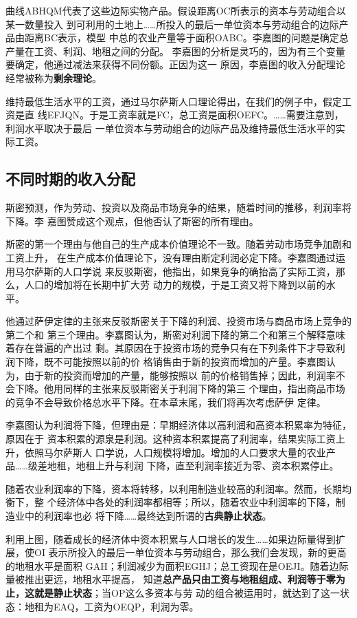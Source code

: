 曲线ABHQM代表了这些边际实物产品。假设距离OC所表示的资本与劳动组合以某一数量投入
到可利用的土地上……所投入的最后一单位资本与劳动组合的边际产品由距离BC表示，模型
中总的农业产量等于面积OABC。李嘉图的问题是确定总产量在工资、利润、地租之间的分配。
李嘉图的分析是灵巧的，因为有三个变量要确定，他通过减法来获得不同份额。正因为这一
原因，李嘉图的收入分配理论经常被称为\textbf{剩余理论}。

维持最低生活水平的工资，通过马尔萨斯人口理论得出，在我们的例子中，假定工资是直
线EFJQN。于是工资率就是FC，总工资是面积OEFC。……需要注意到，利润水平取决于最后
一单位资本与劳动组合的边际产品及维持最低生活水平的实际工资。

\subsection{不同时期的收入分配}

斯密预测，作为劳动、投资以及商品市场竞争的结果，随着时间的推移，利润率将下降。李
嘉图赞成这个观点，但他否认了斯密的所有理由。

斯密的第一个理由与他自己的生产成本价值理论不一致。随着劳动市场竞争加剧和工资上升，
在生产成本价值理论下，没有理由断定利润必定下降。李嘉图通过运用马尔萨斯的人口学说
来反驳斯密，他指出，如果竞争的确抬高了实际工资，那么，人口的增加将在长期中扩大劳
动力的规模，于是工资又将下降到以前的水平。

他通过萨伊定律的主张来反驳斯密关于下降的利润、投资市场与商品市场上竞争的第二个和
第三个理由。李嘉图认为，斯密对利润下降的第二个和第三个解释意味着存在普遍的产出过
剩。其原因在于投资市场的竞争只有在下列条件下才导致利润下降，既不可能按照以前的价
格销售由于新的投资而增加的产量。李嘉图认为，由于新的投资而增加的产量，能够按照以
前的价格销售掉；因此，利润率不会下降。他用同样的主张来反驳斯密关于利润下降的第三
个理由，指出商品市场的竞争不会导致价格总水平下降。在本章末尾，我们将再次考虑萨伊
定律。

李嘉图认为利润将下降，但理由是：早期经济体以高利润和高资本积累率为特征，原因在于
资本积累的源泉是利润。这种资本积累提高了利润率，结果实际工资上升，依照马尔萨斯人
口学说，人口规模将增加。增加的人口要求大量的农业产品……级差地租，地租上升与利润
下降，直至利润率接近为零、资本积累停止。

随着农业利润率的下降，资本将转移，以利用制造业较高的利润率。然而，长期均衡下，整
个经济体中各处的利润率都相等；所以，随着农业中利润率的下降，制造业中的利润率也必
将下降……最终达到所谓的\textbf{古典静止状态}。

利用上图，随着成长的经济体中资本积累与人口增长的发生……如果边际量得到扩展，使OI
表示所投入的最后一单位资本与劳动组合，那么我们会发现，新的更高的地租水平是面积
GAH；利润减少为面积EGHJ；总工资现在是OEJI。随着边际量被推出更远，地租水平提高，
知道\textbf{总产品只由工资与地租组成、利润等于零为止，这就是静止状态}；当OP这么多资本与劳
动的组合被运用时，就达到了这一状态：地租为EAQ，工资为OEQP，利润为零。

